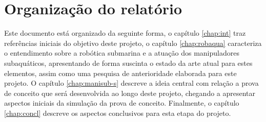 
\section{Organização do relatório}
\label{sec:org}
Este documento está organizado da seguinte forma, o capítulo \ref{chap:int} traz referências iniciais do objetivo deste projeto, o capítulo \ref{chap:robaqua} caracteriza o entendimento sobre a robótica submarina e a atuação dos manipuladores subaquáticos, apresentando de forma suscinta o estado da arte atual para estes elementos, assim como uma pesquisa de anterioridade elaborada para este projeto. O capítulo \ref{chap:manisub-s} descreve a ideia central com relação a prova de conceito que será desenvolvida ao longo deste projeto, chegando a apresentar aspectos iniciais da simulação da prova de conceito. Finalmente, o capítulo \ref{chap:concl} descreve os aspectos conclusivos para esta etapa do projeto.

